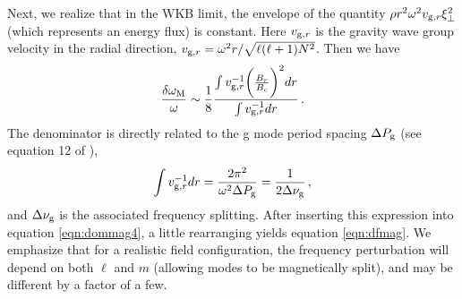 Next, we realize that in the WKB limit, the envelope of the quantity $\rho r^2 \omega^2 v_{{\rm g},r} \xi_\perp^2$ (which represents an energy flux) is constant. Here $v_{{\rm g},r}$ is the gravity wave group velocity in the radial direction, $v_{{\rm g},r} = \omega^2 r/\sqrt{\ell(\ell+1)N^2}$. Then we have
\begin{equation}
\label{eqn:dommag4}
\frac{\delta \omega_{\rm M}}{\omega} \sim \frac{1}{8} \frac{\int v_{{\rm g},r}^{-1} \bigg(\frac{B_r}{B_c}\bigg)^2 d r }{\int v_{{\rm g},r}^{-1} d r }\, .
\end{equation}
The denominator is directly related to the g mode period spacing $\Delta P_{\rm g}$ (see equation 12 of \cite{Chaplin_2013}),
\begin{equation}
\label{eqn:dpg}
\int v_{{\rm g},r}^{-1} dr = \frac{2 \pi^2}{\omega^2 \Delta P_{\rm g}} = \frac{1}{2 \Delta \nu_{\rm g}} \, ,
\end{equation}
and $\Delta \nu _{\rm g}$ is the associated frequency splitting. After inserting this expression into equation \ref{eqn:dommag4}, a little rearranging yields equation \ref{eqn:dfmag}. We emphasize that for a realistic field configuration, the frequency perturbation will depend on both $\ell$ and $m$ (allowing modes to be magnetically split), and may be different by a factor of a few.

